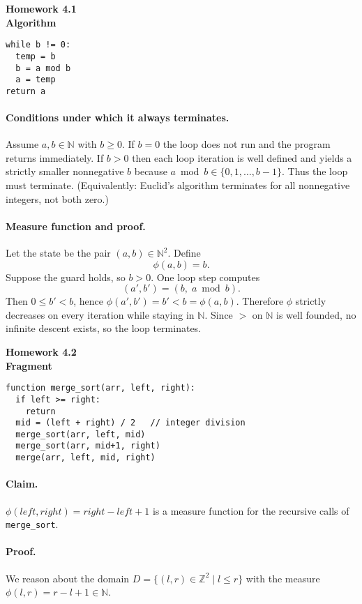 \documentclass{article}
\theoremstyle{plain}
\theoremstyle{definition}
\theoremstyle{remark}
\begin{document}
\textbf{Homework 4.1}\\
\textbf{Algorithm}
\begin{verbatim}
while b != 0:
  temp = b
  b = a mod b
  a = temp
return a
\end{verbatim}

\paragraph{Conditions under which it always terminates.}
Assume \(a,b\in\mathbb{N}\) with \(b\ge 0\). If \(b=0\) the loop does not run and the program returns immediately. If \(b>0\) then each loop iteration is well defined and yields a strictly smaller nonnegative \(b\) because \(a \bmod b\in\{0,1,\dots,b-1\}\). Thus the loop must terminate. (Equivalently: Euclid’s algorithm terminates for all nonnegative integers, not both zero.)

\paragraph{Measure function and proof.}
Let the state be the pair \((a,b)\in\mathbb{N}^2\). Define
\[
\phi(a,b)=b.
\]
Suppose the guard holds, so \(b>0\). One loop step computes
\[
(a',b')=(b,\; a\bmod b).
\]
Then \(0\le b' < b\), hence \(\phi(a',b')=b' < b=\phi(a,b)\).
Therefore \(\phi\) strictly decreases on every iteration while staying in \(\mathbb{N}\). Since \(>\) on \(\mathbb{N}\) is well founded, no infinite descent exists, so the loop terminates.

\textbf{Homework 4.2}\\
\textbf{Fragment}
\begin{verbatim}
function merge_sort(arr, left, right):
  if left >= right:
    return
  mid = (left + right) / 2   // integer division
  merge_sort(arr, left, mid)
  merge_sort(arr, mid+1, right)
  merge(arr, left, mid, right)
\end{verbatim}

\paragraph{Claim.}
\(\displaystyle \phi(left,right)=right-left+1\) is a measure function for the recursive calls of \texttt{merge\_sort}.

\paragraph{Proof.}
We reason about the domain \(D=\{(l,r)\in\mathbb{Z}^2 \mid l\le r\}\) with the measure \(\phi(l,r)=r-l+1\in\mathbb{N}\).
\end{document}
